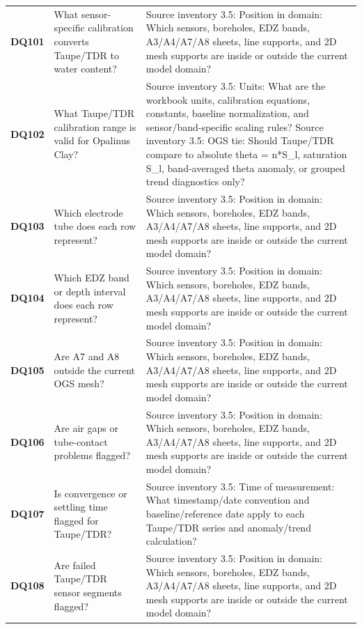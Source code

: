 \begin{longtable}{@{}L{0.09\textwidth} L{0.31\textwidth} L{0.52\textwidth}@{}}
\addlinespace[0.18em]
\textbf{DQ101} & What sensor-specific calibration converts Taupe/TDR to water content? & Source inventory 3.5: Position in domain: Which sensors, boreholes, EDZ bands, A3/A4/A7/A8 sheets, line supports, and 2D mesh supports are inside or outside the current model domain?\\
\addlinespace[0.18em]
\textbf{DQ102} & What Taupe/TDR calibration range is valid for Opalinus Clay? & Source inventory 3.5: Units: What are the workbook units, calibration equations, constants, baseline normalization, and sensor/band-specific scaling rules? Source inventory 3.5: OGS tie: Should Taupe/TDR compare to absolute theta = n*S\_l, saturation S\_l, band-averaged theta anomaly, or grouped trend diagnostics only?\\
\addlinespace[0.18em]
\textbf{DQ103} & Which electrode tube does each row represent? & Source inventory 3.5: Position in domain: Which sensors, boreholes, EDZ bands, A3/A4/A7/A8 sheets, line supports, and 2D mesh supports are inside or outside the current model domain?\\
\addlinespace[0.18em]
\textbf{DQ104} & Which EDZ band or depth interval does each row represent? & Source inventory 3.5: Position in domain: Which sensors, boreholes, EDZ bands, A3/A4/A7/A8 sheets, line supports, and 2D mesh supports are inside or outside the current model domain?\\
\addlinespace[0.18em]
\textbf{DQ105} & Are A7 and A8 outside the current OGS mesh? & Source inventory 3.5: Position in domain: Which sensors, boreholes, EDZ bands, A3/A4/A7/A8 sheets, line supports, and 2D mesh supports are inside or outside the current model domain?\\
\addlinespace[0.18em]
\textbf{DQ106} & Are air gaps or tube-contact problems flagged? & Source inventory 3.5: Position in domain: Which sensors, boreholes, EDZ bands, A3/A4/A7/A8 sheets, line supports, and 2D mesh supports are inside or outside the current model domain?\\
\addlinespace[0.18em]
\textbf{DQ107} & Is convergence or settling time flagged for Taupe/TDR? & Source inventory 3.5: Time of measurement: What timestamp/date convention and baseline/reference date apply to each Taupe/TDR series and anomaly/trend calculation?\\
\addlinespace[0.18em]
\textbf{DQ108} & Are failed Taupe/TDR sensor segments flagged? & Source inventory 3.5: Position in domain: Which sensors, boreholes, EDZ bands, A3/A4/A7/A8 sheets, line supports, and 2D mesh supports are inside or outside the current model domain?\\

\end{longtable}

